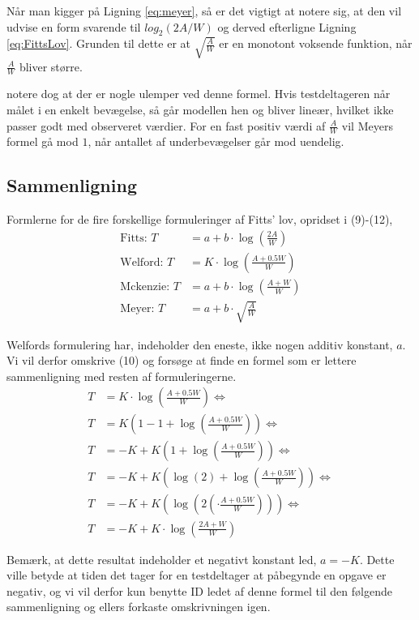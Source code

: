 Når man kigger på Ligning \ref{eq:meyer}, så er det vigtigt at notere sig, at den vil udvise en form svarende til $log_2(2A/W)$ og derved efterligne Ligning \ref{eq:FittsLov}. Grunden til dette er at $\sqrt{\frac{A}{W}}$ er en monotont voksende funktion, når $\frac{A}{W}$ bliver større. 

\cite{goldberg2015} notere dog at der er nogle ulemper ved denne formel. Hvis testdeltageren når målet i en enkelt bevægelse, så går modellen hen og bliver lineær, hvilket ikke passer godt med observeret værdier. For en fast positiv værdi af $\frac{A}{W}$ vil Meyers formel gå mod $1$, når antallet af underbevægelser går mod uendelig.

\subsection*{Sammenligning}
Formlerne for de fire forskellige formuleringer af Fitts' lov, opridset i (9)-(12), 
\begin{align}
\text{Fitts: } T &= a+b\cdot\log\left(\frac{2A}{W}\right)\\
\text{Welford: } T &= K\cdot\log\left(\frac{A+0.5W}{W}\right)\\
\text{Mckenzie: } T &= a+b\cdot\log\left(\frac{A+W}{W}\right)\\
\text{Meyer: } T &= a+b\cdot\sqrt{\frac{A}{W}}
\end{align}

Welfords formulering har, indeholder den eneste, ikke nogen additiv konstant, $a$. Vi vil derfor omskrive (10) og forsøge at finde en formel som er lettere sammenligning med resten af formuleringerne.
\begin{align*}
T &= K\cdot\log\left(\frac{A+0.5W}{W}\right)\Leftrightarrow\\
T &= K\left(1-1+\log\left(\frac{A+0.5W}{W}\right)\right)\Leftrightarrow\\
T &= -K+K\left(1+\log\left(\frac{A+0.5W}{W}\right)\right)\Leftrightarrow\\
T &= -K+K\left(\log(2)+\log\left(\frac{A+0.5W}{W}\right)\right)\Leftrightarrow\\
T &= -K+K\left(\log\left(2\left(\cdot\frac{A+0.5W}{W}\right)\right)\right)\Leftrightarrow\\
T &= -K+K\cdot\log\left(\frac{2A+W}{W}\right)
\end{align*}

Bemærk, at dette resultat indeholder et negativt konstant led, $a=-K$. Dette ville betyde at tiden det tager for en testdeltager at påbegynde en opgave er negativ, og vi vil derfor kun benytte ID ledet af denne formel til den følgende sammenligning og ellers forkaste omskrivningen igen.

